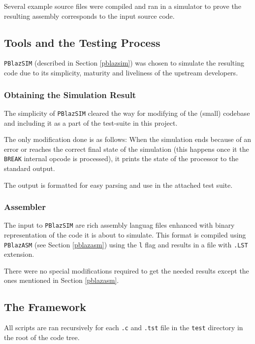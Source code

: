     Several example source files were compiled and ran in a simulator to prove the resulting assembly corresponds to the input source code.

        \subsection{Tools and the Testing Process}

        \texttt{PBlazSIM} (described in Section \ref{pblazsim}) was chosen to simulate the resulting code due to its simplicity, maturity and liveliness of the upstream developers.

            \subsubsection{Obtaining the Simulation Result}

                The simplicity of \texttt{PBlazSIM} cleared the way for modifying of the (small) codebase and including it as a part of the test-suite in this project.

                The only modification done is as follows: When the simulation ends because of an error or reaches the correct final state of the simulation (this happens once it  the \texttt{BREAK} internal opcode is processed), it prints the state of the processor to the standard output.

                The output is formatted for easy parsing and use in the attached test suite.

            \subsubsection{Assembler}

                The input to \texttt{PBlazSIM} are rich assembly languag files enhanced with binary representation of the code it is about to simulate. This format is compiled using \texttt{PBlazASM} (see Section \ref{pblazasm}) using the \texttt{\-l} flag and results in a file with \texttt{.LST} extension.

                There were no special modifications required to get the needed results except the ones mentioned in Section \ref{pblazasm}.

        \subsection{The Framework}

        All scripts are ran recursively for each \texttt{.c} and \texttt{.tst} file in the \texttt{test} directory in the root of the code tree.

